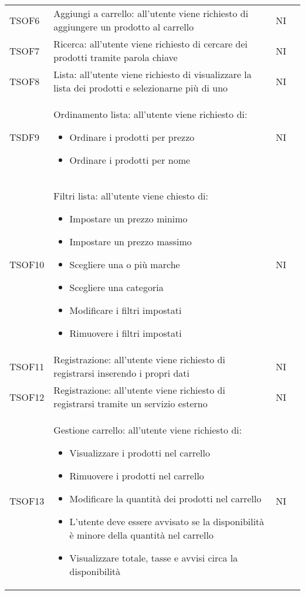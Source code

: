 \begin{center}
\begin{longtable}[!h]{p{50px} p{245px} p{75px} p{50px}}
TSOF6                            & Aggiungi a carrello: all'utente viene richiesto di aggiungere un prodotto al carrello                                                            & NI             \\
TSOF7                            & Ricerca: all'utente viene richiesto di cercare dei prodotti tramite parola chiave                                                                & NI             \\
TSOF8                            & Lista: all'utente viene richiesto di visualizzare la lista dei prodotti e selezionarne pi\`u di uno                                              & NI             \\
TSDF9                            & Ordinamento lista: all'utente viene richiesto di: \begin{itemize} \item Ordinare i prodotti per prezzo \item Ordinare i prodotti per nome \end{itemize}                                                                      & NI             \\
TSOF10                           & Filtri lista: all'utente viene chiesto di: \begin{itemize} \item Impostare un prezzo minimo \item Impostare un prezzo massimo \item Scegliere una o pi\`u marche \item Scegliere una categoria \item Modificare i filtri impostati \item Rimuovere i filtri impostati \end{itemize}                                                                            & NI             \\
TSOF11                           & Registrazione: all'utente viene richiesto di registrarsi inserendo i propri dati                                                                 & NI             \\
TSOF12                           & Registrazione: all'utente viene richiesto di registrarsi tramite un servizio esterno                                                             & NI             \\
TSOF13                           & Gestione carrello: all'utente viene richiesto di: \begin{itemize} \item Visualizzare i prodotti nel carrello \item Rimuovere i prodotti nel carrello \item Modificare la quantità dei prodotti nel carrello \item L'utente deve essere avvisato se la disponibilità è minore della quantità nel carrello\item Visualizzare totale, tasse e avvisi circa la disponibilità \end{itemize}                                                                     & NI             \\

\end{longtable}
\end{center}
